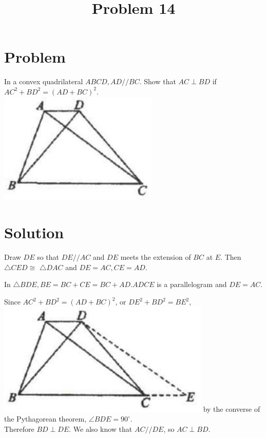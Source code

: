 \documentclass{article}
\title{Problem 14}
\date{}
\begin{document}
\maketitle

\section*{Problem}
In a convex quadrilateral \(A B C D, A D / / B C\). Show that \(A C \perp B D\) if \(A C^{2}+B D^{2}=(A D+B C)^{2}\).\\
\centering
\includegraphics[width=\textwidth]{images/problem_image_1.jpg}

\section*{Solution}
Draw \(D E\) so that \(D E / / A C\) and \(D E\) meets the extension of \(B C\) at \(E\). Then \(\triangle C E D \cong\) \(\triangle D A C\) and \(D E=A C, C E=A D\).

In \(\triangle B D E, B E=B C+C E=B C+A D . A D C E\) is a parallelogram and \(D E=A C\).

Since \(A C^{2}+B D^{2}=(A D+B C)^{2}\), or \(D E^{2}+B D^{2}=B E^{2}\),\\
\includegraphics[width=\textwidth]{images/reasoning_image_1.jpg} by the converse of the Pythagorean theorem, \(\angle B D E=90^{\circ}\).\\
Therefore \(B D \perp D E\). We also know that \(A C / / D E\), so \(A C \perp B D\).
\end{document}
